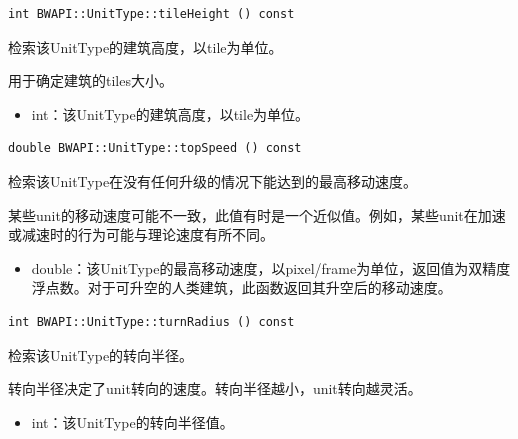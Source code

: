 \begin{tcolorbox}[colback=white, colframe=black!60!white, title=tileHeight(), arc=0mm]
    \begin{verbatim}
int BWAPI::UnitType::tileHeight () const
    \end{verbatim}
    检索该UnitType的建筑高度，以tile为单位。\par 用于确定建筑的tiles大小。
    \begin{return}
        \begin{itemize}
            \item int：该UnitType的建筑高度，以tile为单位。
        \end{itemize}
    \end{return}
\end{tcolorbox}


\begin{tcolorbox}[colback=white, colframe=black!60!white, title=topSpeed(), arc=0mm]
    \begin{verbatim}
double BWAPI::UnitType::topSpeed () const
    \end{verbatim}
    检索该UnitType在没有任何升级的情况下能达到的最高移动速度。
    \begin{note}
        某些unit的移动速度可能不一致，此值有时是一个近似值。例如，某些unit在加速或减速时的行为可能与理论速度有所不同。
    \end{note}
    \begin{return}
        \begin{itemize}
            \item double：该UnitType的最高移动速度，以pixel/frame为单位，返回值为双精度浮点数。对于可升空的人类建筑，此函数返回其升空后的移动速度。
        \end{itemize}
    \end{return}
\end{tcolorbox}


\begin{tcolorbox}[colback=white, colframe=black!60!white, title=turnRadius(), arc=0mm]
    \begin{verbatim}
int BWAPI::UnitType::turnRadius () const
    \end{verbatim}
    检索该UnitType的转向半径。\par 转向半径决定了unit转向的速度。转向半径越小，unit转向越灵活。
    \begin{return}
        \begin{itemize}
            \item int：该UnitType的转向半径值。
        \end{itemize}
    \end{return}
\end{tcolorbox}


